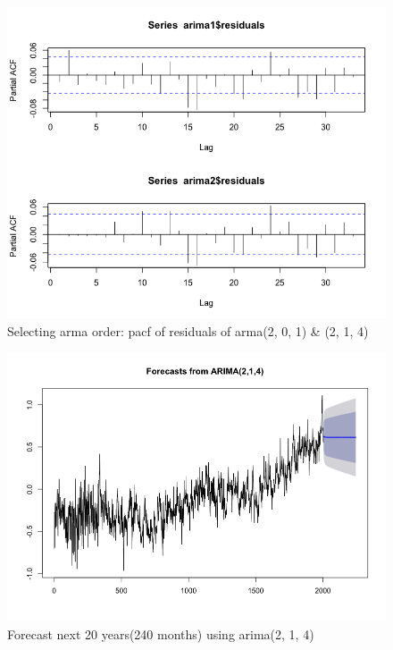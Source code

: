 \documentclass[a4paper,11pt]{article}
\begin{document}
\begin{figure}[H]
\centering
\caption{Selecting arma order: pacf of residuals of arma(2, 0, 1) \& (2, 1, 4)}
\includegraphics[scale=.5]{arima_pacf.png}
\end{figure}

\begin{figure}[H]
\centering
\caption{Forecast next 20 years(240 months) using arima(2, 1, 4)}
\includegraphics[scale=.5]{arima_forecast.png}
\end{figure}
\end{document}
